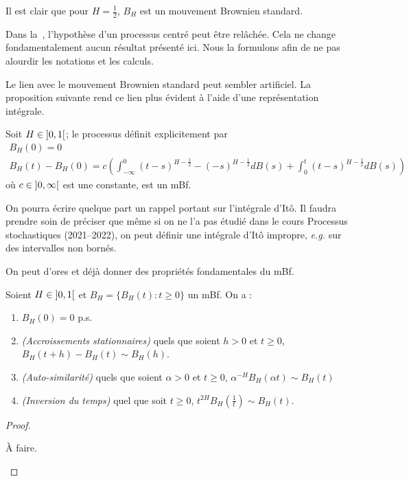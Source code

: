 Il est clair que pour $H=\frac{1}{2}$, $B_H$ est un mouvement
Brownien standard.

\begin{remarque}
  Dans la~, l'hypothèse d'un processus centré
  peut être relâchée. Cela ne change fondamentalement aucun résultat
  présenté ici. Nous la formulons afin de ne pas alourdir les
  notations et les calculs.
\end{remarque}

Le lien avec le mouvement Brownien standard peut sembler
artificiel. La proposition suivante rend ce lien plus évident à l'aide
d'une représentation intégrale.

\begin{proposition}
  Soit $H\in\left]0,1\right[$; le processus définit explicitement par
  \begin{gather*}
    B_H(0) = 0 \\
    B_H(t) - B_H(0) = c\left(\int_{-\infty}^0 (t-s)^{H- \frac{1}{2}} - (-s)^{H- \frac{1}{2} } dB(s) + \int_0^t (t-s)^{H- \frac{1}{2}} dB(s)\right)
  \end{gather*}
  où $c\in\left]0,\infty\right[$ est une constante, est un mBf.
\end{proposition}

\begin{alert}
  On pourra écrire quelque part un rappel portant sur l'intégrale
  d'Itô. Il faudra prendre soin de préciser que même si on ne l'a pas
  étudié dans le cours \og{}Processus stochastiques\fg{} (2021--2022),
  on peut définir une intégrale d'Itô impropre, \emph{e.g.} sur des
  intervalles non bornés.
\end{alert}

On peut d'ores et déjà donner des propriétés fondamentales du mBf.

\begin{proposition}
  \label{pro:fbm-basic-properties}
  Soient $H\in\left]0,1\right[$ et $B_H = \{B_H(t) : t\geq 0\}$ un mBf. On
  a :
  \begin{enumerate}
  \item $B_H(0) = 0$ p.s.
  \item \emph{(Accroissements stationnaires)} quels que soient $h>0$
    et $t\geq 0$, $B_H(t+h)-B_H(t)\sim B_H(h)$.
  \item \emph{(Auto-similarité)} quels que soient $\alpha>0$ et
    $t\geq 0$, $\alpha^{-H} B_H(\alpha t) \sim B_H(t)$
  \item \emph{(Inversion du temps)} quel que soit $t\geq 0$,
    $t^{2H}B_H(\frac{1}{t}) \sim B_H(t)$.
  \end{enumerate}
\end{proposition}
\begin{proof}
  \begin{alert}
    À faire.
  \end{alert}
\end{proof}

